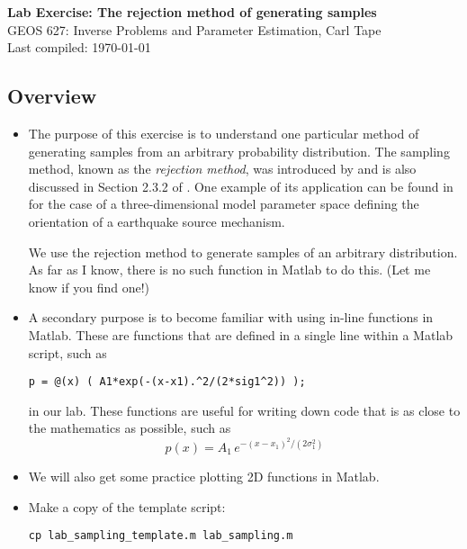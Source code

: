 \documentclass[11pt,titlepage,fleqn]{article}
\begin{document}

\begin{spacing}{1.2}
\centering
{\large \bf Lab Exercise: The rejection method of generating samples} \\
GEOS 627: Inverse Problems and Parameter Estimation, Carl Tape \\
Last compiled: \today
\end{spacing}


\subsection*{Overview}

\begin{itemize}
\item The purpose of this exercise is to understand one particular method of generating samples from an arbitrary probability distribution. The sampling method, known as the {\em rejection method}, was introduced by \citet{vonNeumann1951} and is also discussed in Section 2.3.2 of \citet{Tarantola2005}. One example of its application can be found in \citet{SilwalTape2016} for the case of a three-dimensional model parameter space defining the orientation of a earthquake source mechanism.

We use the rejection method to generate samples of an arbitrary distribution. As far as I know, there is no such function in Matlab to do this. (Let me know if you find one!)

\item A secondary purpose is to become familiar with using in-line functions in Matlab. These are functions that are defined in a single line within a Matlab script, such as

\verb+p = @(x) ( A1*exp(-(x-x1).^2/(2*sig1^2)) );+

in our lab. These functions are useful for writing down code that is as close to the mathematics as possible, such as
%
\begin{equation}
p(x) = A_1\,e^{-(x-x_1)^2/(2\sigma_1^2)}
\end{equation}

\item We will also get some practice plotting 2D functions in Matlab.

\item Make a copy of the template script:
%
\begin{verbatim}
cp lab_sampling_template.m lab_sampling.m
\end{verbatim}

\end{itemize}
\end{document}
